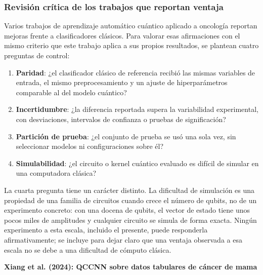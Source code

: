 
\subsubsection{Revisión crítica de los trabajos que reportan ventaja}
\label{sec:revision_critica}

Varios trabajos de aprendizaje automático cuántico aplicado a oncología reportan mejoras frente a clasificadores clásicos. Para valorar esas afirmaciones con el mismo criterio que este trabajo aplica a sus propios resultados, se plantean cuatro preguntas de control:

\begin{enumerate}
  \item \textbf{Paridad}: ¿el clasificador clásico de referencia recibió las mismas variables de entrada, el mismo preprocesamiento y un ajuste de hiperparámetros comparable al del modelo cuántico?
  \item \textbf{Incertidumbre}: ¿la diferencia reportada supera la variabilidad experimental, con desviaciones, intervalos de confianza o pruebas de significación?
  \item \textbf{Partición de prueba}: ¿el conjunto de prueba se usó una sola vez, sin seleccionar modelos ni configuraciones sobre él?
  \item \textbf{Simulabilidad}: ¿el circuito o kernel cuántico evaluado es difícil de simular en una computadora clásica?
\end{enumerate}

La cuarta pregunta tiene un carácter distinto. La dificultad de simulación es una propiedad de una familia de circuitos cuando crece el número de qubits, no de un experimento concreto: con una docena de qubits, el vector de estado tiene unos pocos miles de amplitudes y cualquier circuito se simula de forma exacta. Ningún experimento a esta escala, incluido el presente, puede responderla afirmativamente; se incluye para dejar claro que una ventaja observada a esa escala no se debe a una dificultad de cómputo clásica.

\textbf{Xiang et al. (2024): QCCNN sobre datos tabulares de cáncer de mama}

